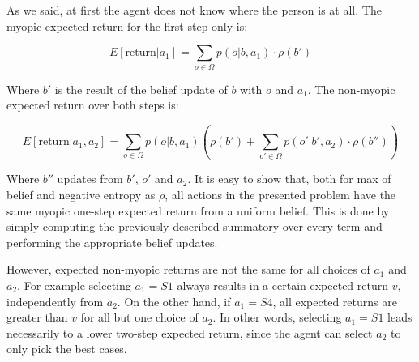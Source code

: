 \begin{center}
\end{center}

As we said, at first the agent does not know where the person is at all. The myopic expected return
for the first step only is:

\[ E[\text{return}| a_1 ] = \sum_{o\in \Omega} p(o | b, a_1) \cdot \rho(b') \]

Where $b'$ is the result of the belief update of $b$ with $o$ and $a_1$. The non-myopic expected return over
both steps is:

\[ E[\text{return}| a_1, a_2] = \sum_{o \in \Omega} p(o | b, a_1) \left ( \rho(b') + \sum_{o' \in
\Omega} p(o'| b', a_2) \cdot \rho(b'') \right ) \]

Where $b''$ updates from $b'$, $o'$ and $a_2$. It is easy to show that, both for max of belief and
negative entropy as $\rho$, all actions in the presented problem have the same myopic one-step
expected return from a uniform belief. This is done by simply computing the previously described
summatory over every term and performing the appropriate belief updates.

However, expected non-myopic returns are not the same for all choices of $a_1$ and $a_2$. For
example selecting $a_1 = S1$ always results in a certain expected return $v$, independently from
$a_2$. On the other hand, if $a_1 = S4$, all expected returns are greater than $v$ for all but one
choice of $a_2$. In other words, selecting $a_1 = S1$ leads necessarily to a lower two-step expected
return, since the agent can select $a_2$ to only pick the best cases.

